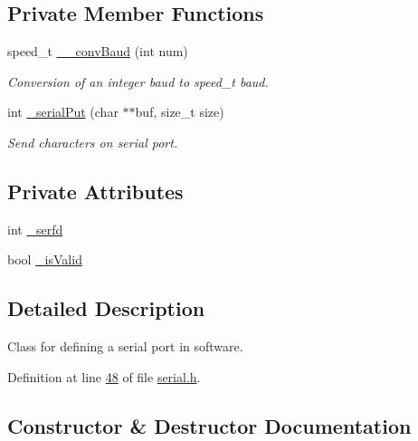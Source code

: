 \subsection*{Private Member Functions}
\begin{DoxyCompactItemize}
\item 
speed\+\_\+t \mbox{\hyperlink{classFOHSerial_adad9afc88e0b6626d623fc19abb41c90}{\+\_\+\+\_\+conv\+Baud}} (int num)
\begin{DoxyCompactList}\small\item\em Conversion of an integer baud to speed\+\_\+t baud. \end{DoxyCompactList}\item 
int \mbox{\hyperlink{classFOHSerial_add9b2e556b56459b2eddc9b71f5c80ed}{\+\_\+serial\+Put}} (char $\ast$$\ast$buf, size\+\_\+t size)
\begin{DoxyCompactList}\small\item\em Send characters on serial port. \end{DoxyCompactList}\end{DoxyCompactItemize}
\subsection*{Private Attributes}
\begin{DoxyCompactItemize}
\item 
int \mbox{\hyperlink{classFOHSerial_ab682f6f446d38c7954dfb9cae43b6c73}{\+\_\+serfd}}
\item 
bool \mbox{\hyperlink{classFOHSerial_a26a5f17316ae345ebbdb8d99d3ad2a84}{\+\_\+is\+Valid}}
\end{DoxyCompactItemize}


\subsection{Detailed Description}
Class for defining a serial port in software. 

Definition at line \mbox{\hyperlink{serial_8h_source_l00048}{48}} of file \mbox{\hyperlink{serial_8h_source}{serial.\+h}}.



\subsection{Constructor \& Destructor Documentation}
\mbox{\label{classFOHSerial_a9d043cc8235a679af5c1dc68595fba02}} 
